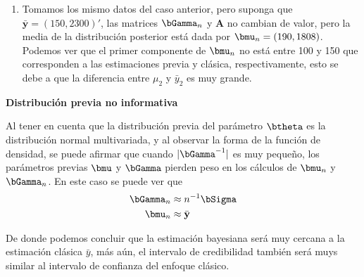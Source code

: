 \documentclass[10pt,openright]{book}\usepackage[]{graphicx}\usepackage[]{color}
\makeatletter
\newenvironment{kframe}{%
 \def\at@end@of@kframe{}%
 \ifinner\ifhmode%
  \def\at@end@of@kframe{\end{minipage}}%
  \begin{minipage}{\columnwidth}%
 \fi\fi%
 \def\FrameCommand##1{\hskip\@totalleftmargin \hskip-\fboxsep
 \colorbox{shadecolor}{##1}\hskip-\fboxsep
     \hskip-\linewidth \hskip-\@totalleftmargin \hskip\columnwidth}%
 \MakeFramed {\advance\hsize-\width
   \@totalleftmargin\z@ \linewidth\hsize
   \@setminipage}}%
 {\par\unskip\endMakeFramed%
 \at@end@of@kframe}
\newenvironment{knitrout}{}{} %
\makeatother
\begin{document}
\begin{enumerate}
\begin{knitrout}
\begin{kframe}
\begin{alltt}
\end{alltt}
\end{kframe}
\end{knitrout}
\item Tomamos los mismo datos del caso anterior, pero suponga que $\bar{\mathbf{y}}=(150,2300)'$, las matrices $\bGamma_n$ y $\mathbf{A}$ no cambian de valor, pero la media de la distribuci\'on posterior est\'a dada por $\bmu_n=(190,1808)$. Podemos ver que el primer componente de $\bmu_n$ no est\'a entre 100 y 150 que corresponden a las estimaciones previa y cl\'asica, respectivamente, esto se debe a que la diferencia entre $\mu_2$ y $\bar{y}_2$ es muy grande.
\end{enumerate}

\textbf{Distribuci\'on previa no informativa}

Al tener en cuenta que la distribuci\'on previa del par\'ametro $\btheta$ es la distribuci\'on normal multivariada, y al observar la forma de la funci\'on de densidad, se puede afirmar que cuando $|\bGamma^{-1}|$ es muy peque\~no, los par\'ametros previas $\bmu$ y $\bGamma$ pierden peso en los c\'alculos de $\bmu_n$ y $\bGamma_n$. En este caso se puede ver que
\begin{align*}
\bGamma_n&\approx n^{-1}\bSigma\\
\bmu_n&\approx \bar{\mathbf{y}}
\end{align*}

De donde podemos concluir que la estimaci\'on bayesiana ser\'a muy cercana a la estimaci\'on cl\'asica $\bar{y}$, m\'as a\'un, el intervalo de credibilidad tambi\'en ser\'a muys similar al intervalo de confianza del enfoque cl\'asico.
\end{document}
